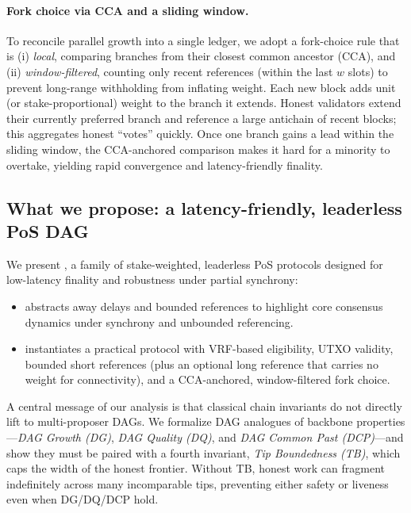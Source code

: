 \paragraph{Fork choice via CCA and a sliding window.}
To reconcile parallel growth into a single ledger, we adopt a fork-choice rule that is (i) \emph{local}, comparing branches from their closest common ancestor (CCA), and (ii) \emph{window-filtered}, counting only recent references (within the last $w$ slots) to prevent long-range withholding from inflating weight. Each new block adds unit (or stake-proportional) weight to the branch it extends. Honest validators extend their currently preferred branch and reference a large antichain of recent blocks; this aggregates honest “votes” quickly. Once one branch gains a lead within the sliding window, the CCA-anchored comparison makes it hard for a minority to overtake, yielding rapid convergence and latency-friendly finality.

\subsection{What we propose: a latency-friendly, leaderless PoS DAG}
We present \Proj, a family of stake-weighted, leaderless PoS protocols designed for low-latency finality and robustness under partial synchrony:
\begin{itemize}
\item \textbf{\ProjIdeal} abstracts away delays and bounded references to highlight core consensus dynamics under synchrony and unbounded referencing.
\item \textbf{\ProjBase} instantiates a practical protocol with VRF-based eligibility, UTXO validity, bounded short references (plus an optional long reference that carries no weight for connectivity), and a CCA-anchored, window-filtered fork choice.
\end{itemize}
A central message of our analysis is that classical chain invariants do not directly lift to multi-proposer DAGs. We formalize DAG analogues of backbone properties---\emph{DAG Growth (DG)}, \emph{DAG Quality (DQ)}, and \emph{DAG Common Past (DCP)}---and show they must be paired with a fourth invariant, \emph{Tip Boundedness (TB)}, which caps the width of the honest frontier. Without TB, honest work can fragment indefinitely across many incomparable tips, preventing either safety or liveness even when DG/DQ/DCP hold.

